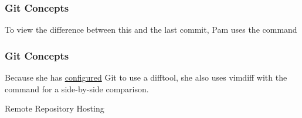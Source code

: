 \begin{frame}[fragile]\frametitle{Git Concepts}
    To view the difference between this and the last
    commit, Pam uses the command 

    \begin{center} 
        \begin{figure}[h!] \centering
        \end{figure}
    \end{center}
\end{frame}

\begin{frame}[fragile]\frametitle{Git Concepts}
    Because she has 
    \href{http://stackoverflow.com/questions/3713765/viewing%
    -all-git-diffs-with-vimdiff}{configured} 
    Git to use a difftool, 
    she also uses vimdiff with the command
    for a side-by-side comparison.

    \begin{center} 
        \begin{figure}[h!] \centering
        \end{figure}
    \end{center}
\end{frame}

\begin{frame}[c]
    \begin{center}
        \Large Remote Repository Hosting
    \end{center}
\end{frame}

